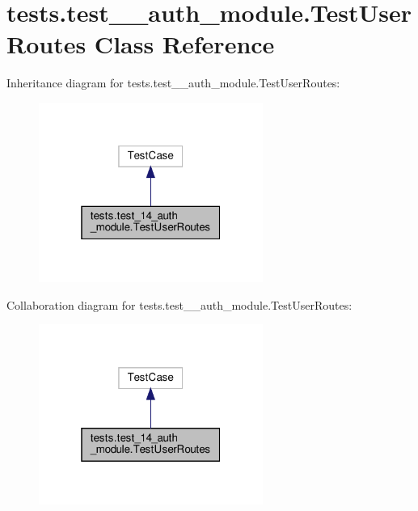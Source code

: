 \hypertarget{classtests_1_1test__14__auth__module_1_1_test_user_routes}{}\section{tests.\+test\+\_\+\_\+auth\+\_\+module.\+Test\+User\+Routes Class Reference}
\label{classtests_1_1test__14__auth__module_1_1_test_user_routes}


Inheritance diagram for tests.\+test\+\_\+\_\+auth\+\_\+module.\+Test\+User\+Routes\+:\nopagebreak
\begin{figure}[H]
\begin{center}
\leavevmode
\includegraphics[width=208pt]{classtests_1_1test__14__auth__module_1_1_test_user_routes__inherit__graph}
\end{center}
\end{figure}


Collaboration diagram for tests.\+test\+\_\+\_\+auth\+\_\+module.\+Test\+User\+Routes\+:\nopagebreak
\begin{figure}[H]
\begin{center}
\leavevmode
\includegraphics[width=208pt]{classtests_1_1test__14__auth__module_1_1_test_user_routes__coll__graph}
\end{center}
\end{figure}
